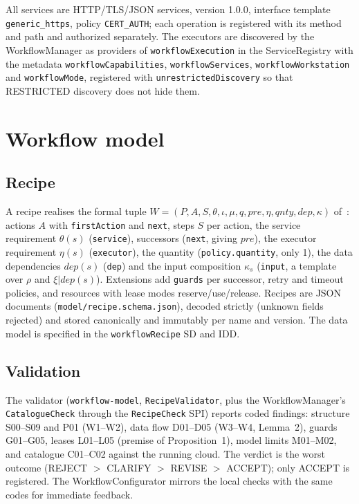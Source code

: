 \documentclass[a4paper]{arrowhead}
\begin{document}
All services are HTTP/TLS/JSON services, version 1.0.0, interface template \texttt{generic\_\allowbreak{}https}, policy
\texttt{CERT\_AUTH}; each operation is registered with its method and path and authorized separately. The executors are
discovered by the WorkflowManager as providers of \texttt{workflow\allowbreak{}Execution} in the ServiceRegistry with the metadata
\texttt{workflow\allowbreak{}Capabilities}, \texttt{workflow\allowbreak{}Services}, \texttt{workflow\allowbreak{}Workstation} and \texttt{workflowMode}, registered
with \texttt{unrestricted\allowbreak{}Discovery} so that RESTRICTED discovery does not hide them.

\section{Workflow model}
\label{sec:model}
\subsection{Recipe}
A recipe realises the formal tuple $W = (P, A, S, \theta, \iota, \mu, q, pre, \eta, qnty, dep, \kappa)$ of~\cite{varga2026}:
actions $A$ with \texttt{firstAction} and \texttt{next}, steps $S$ per action, the service requirement $\theta(s)$
(\texttt{service}), successors (\texttt{next}, giving $pre$), the executor requirement $\eta(s)$ (\texttt{executor}), the
quantity (\texttt{policy.\allowbreak{}quantity}, only 1), the data dependencies $dep(s)$ (\texttt{dep}) and the input composition
$\kappa_s$ (\texttt{input}, a template over $\rho$ and $\xi|dep(s)$). Extensions add \texttt{guards} per successor,
retry and timeout policies, and resources with lease modes reserve/use/release. Recipes are JSON documents
(\texttt{model/\allowbreak{}recipe.\allowbreak{}schema.\allowbreak{}json}), decoded strictly (unknown fields rejected) and stored canonically and immutably per
name and version. The data model is specified in the \texttt{workflow\allowbreak{}Recipe} SD and IDD.

\subsection{Validation}
The validator (\texttt{workflow-\allowbreak{}model}, \texttt{Recipe\allowbreak{}Validator}, plus the WorkflowManager's \texttt{Catalogue\allowbreak{}Check} through
the \texttt{RecipeCheck} SPI) reports coded findings: structure S00--S09 and P01 (W1--W2), data flow D01--D05 (W3--W4,
Lemma~2), guards G01--G05, leases L01--L05 (premise of Proposition~1), model limits M01--M02, and catalogue C01--C02
against the running cloud. The verdict is the worst outcome (REJECT $>$ CLARIFY $>$ REVISE $>$ ACCEPT); only ACCEPT is
registered. The WorkflowConfigurator mirrors the local checks with the same codes for immediate feedback.
\end{document}

